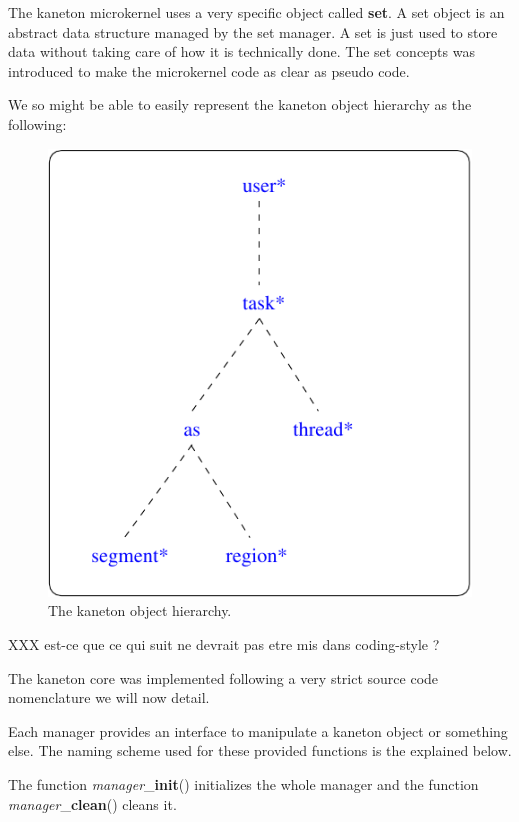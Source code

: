 The kaneton microkernel uses a very specific object called \textbf{set}.
A set object is an abstract data structure managed by the set manager.
A set is just used to store data without taking care of how it is technically
done. The set concepts was introduced to make the microkernel code as
clear as pseudo code.

We so might be able to easily represent the kaneton object hierarchy as
the following:

\begin{figure}[h]
  \begin{center}
    \includegraphics[scale=0.8]{figures/nomenclature_hierarchy.pdf}
    \caption{The kaneton object hierarchy.}
    \label{figure:nomenclature_hierarchy}
  \end{center}
\end{figure}

XXX est-ce que ce qui suit ne devrait pas etre mis dans coding-style ?

The kaneton core was implemented following a very strict source code
nomenclature we will now detail.

Each manager provides an interface to manipulate a kaneton object or
something else. The naming scheme used for these provided functions
is the explained below.

The function \textit{manager}\_\textbf{init}() initializes the whole
manager and the function \textit{manager}\_\textbf{clean}() cleans it.

